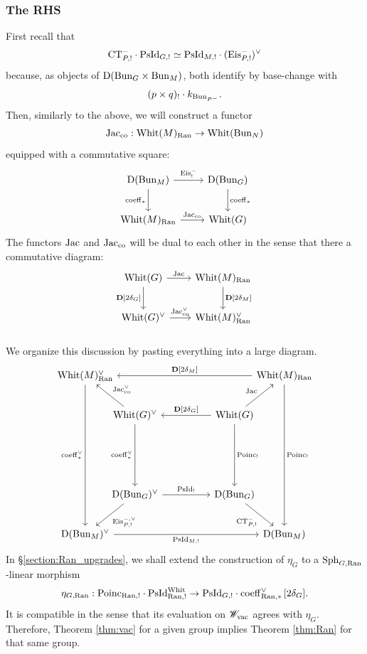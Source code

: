 \subsubsection{The RHS} First recall that
    \[
    \mathrm{CT}^-_{P, !} \cdot \mathrm{PsId}_{G,!} 
    \simeq \mathrm{PsId}_{M,!} \cdot (\mathrm{Eis}_{P,!}^-)^\vee
    \]
because, as objects of $\mathrm{D}(\mathrm{Bun}_G \times \mathrm{Bun}_M)$, both identify by base-change with
    \[(p \times q)_! \cdot k_{\mathrm{Bun}_{P^-}}.\]
Then, similarly to the above, we will construct a functor
    \[\mathrm{Jac}_{\mathrm{co}} : \mathrm{Whit}(M)_{\mathrm{Ran}} \to \mathrm{Whit}(\mathrm{Bun}_N)\]
equipped with a commutative square:
\[
\begin{tikzcd}[
  column sep={8em,between origins},
  row sep={4em,between origins}
]
  \DMod(\Bun_M) \arrow[r, "\Eis_!^-"] \arrow[d, "\coeff_*" left] & \DMod(\Bun_G) \arrow[d, "\coeff_*"] \\
  \Whit(M)_\Ran \arrow[r, "\Jac_{\co}"] & \Whit(G)
\end{tikzcd}
\]
The functors $\mathrm{Jac}$ and $\mathrm{Jac}_{\mathrm{co}}$ will be dual to each other in the sense that there a commutative diagram:
\[
\begin{tikzcd}[
  column sep={8em,between origins},
  row sep={4em,between origins}
]
  \Whit(G) \arrow[r, "\Jac"] \arrow[d, "\DD{[2\delta_G]}" left] & \Whit(M)_\Ran \arrow[d, "\DD{[2\delta_M]}"] \\
  \Whit(G)^\vee \arrow[r, "\Jac_{\co}^\vee"] & \Whit(M)_\Ran^\vee 
\end{tikzcd}
\]

\subsubsection{} We organize this discussion by pasting everything into a large diagram.
\begin{equation}
\label{eqn:the_cube}
\begin{tikzcd}[
  column sep={5em,between origins},
  row sep={4em,between origins}
]
  \Whit(M)_\Ran^\vee \arrow[dddd, "\coeff_*^\vee" left] & & & & \Whit(M)_\Ran \arrow[llll, "\DD{[2\delta_M]}" above] \arrow[dddd, "\Poinc_!"] \\
  & \Whit(G)^\vee \arrow[dd, "\coeff_*^\vee" left] \arrow[ul, "\Jac_\co^\vee" above right] & & \Whit(G) \arrow[ll, "\DD{[2\delta_G]}" above] \arrow[dd, "\Poinc_!"] \arrow[ur, "\Jac"] & \\
  & & & & \\
  & \DMod(\Bun_G)^\vee \arrow[dl, "\Eis_{P,!}^{-,\vee}"] \arrow[rr, "\PsId_!"] & & \DMod(\Bun_G) \arrow[dr, "\CT_{P,!}^-" below left]  &  \\
  \DMod(\Bun_M)^\vee \arrow[rrrr, "\PsId_{M,!}" below] & & & & \DMod(\Bun_M)
\end{tikzcd}
\end{equation}
In \S\ref{section:Ran_upgrades}, we shall extend the construction of $\eta_G$ to a $\mathrm{Sph}_{G,\mathrm{Ran}}$-linear morphism
    \[
    \eta_{G,\mathrm{Ran}} : \mathrm{Poinc}_{\mathrm{Ran}, !} \cdot \mathrm{PsId}_{\mathrm{Ran}, !}^{\mathrm{Whit}} \to \mathrm{PsId}_{G,!} \cdot \mathrm{coeff}_{\mathrm{Ran}, *}^\vee \, [2\delta_G].
    \]
It is compatible in the sense that its evaluation on $\mathscr{W}_{\mathrm{vac}}$ agrees with $\eta_G$. Therefore, Theorem \ref{thm:vac} for a given group implies Theorem \ref{thm:Ran} for that same group.

